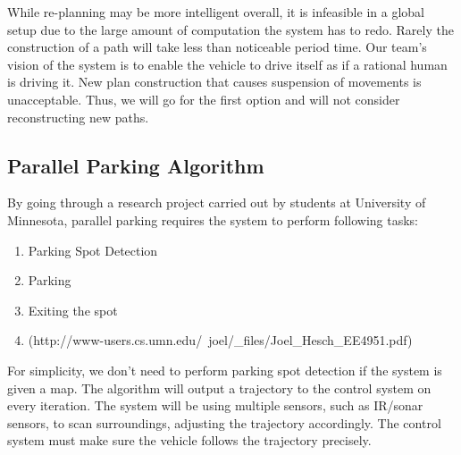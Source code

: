 \documentclass[compsoc,draftclsnofoot,onecolumn,10pt]{IEEEtran}
\begin{document}
While re-planning may be more intelligent overall, it is infeasible in a global 
setup due to the large amount of computation the system has to redo. Rarely the 
construction of a path will take less than noticeable period time. Our team’s 
vision of the system is to enable the vehicle to drive itself as if a rational 
human is driving it. New plan construction that causes suspension of movements is 
unacceptable. Thus, we will go for the first option and will not consider 
reconstructing new paths.\par

\subsection{Parallel Parking Algorithm}
By going through a research project carried out by students at University of 
Minnesota, parallel parking requires the system to perform following tasks:\par

\begin{enumerate}
\item Parking Spot Detection
\item Parking
\item Exiting the spot
\item (http://www-users.cs.umn.edu/~joel/_files/Joel_Hesch_EE4951.pdf)
\end{enumerate}

For simplicity, we don’t need to perform parking spot detection if the system 
is given a map. The algorithm will output a trajectory to the control system on 
every iteration. The system will be using multiple sensors, such as IR/sonar 
sensors, to scan surroundings, adjusting the trajectory accordingly. The control 
system must make sure the vehicle follows the trajectory precisely.\par
\end{document}
